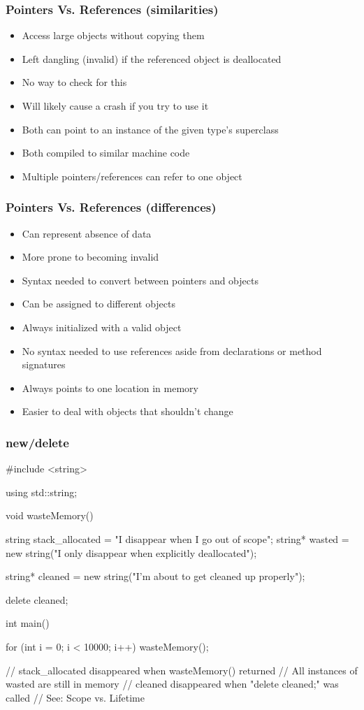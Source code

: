 \documentclass[glossy]{beamer}
\begin{document}
\begin{frame}[fragile=singleslide]
  \frametitle{Pointers Vs. References (similarities)}
  \begin{itemize}
    \item Access large objects without copying them
    \item Left dangling (invalid) if the referenced object is deallocated
    \item No way to check for this
    \item Will likely cause a crash if you try to use it
    \item Both can point to an instance of the given type's superclass
    \item Both compiled to similar machine code
    \item Multiple pointers/references can refer to one object
  \end{itemize}
\end{frame}

\begin{frame}[fragile=singleslide]
  \frametitle{Pointers Vs. References (differences)}
  \begin{itemize}
    \item Can represent absence of data
    \item More prone to becoming invalid
    \item Syntax needed to convert between pointers and objects
    \item Can be assigned to different objects
    \item Always initialized with a valid object
    \item No syntax needed to use references aside from declarations or method signatures
    \item Always points to one location in memory
    \item Easier to deal with objects that shouldn't change
  \end{itemize}
\end{frame}

\begin{frame}[fragile=singleslide]
  \frametitle{new/delete}
  \begin{cppcode}
#include <string>

using std::string;

void wasteMemory() {
  string stack_allocated = "I disappear when I go out of scope";
  string* wasted = new string("I only disappear when explicitly deallocated");

  string* cleaned = new string("I'm about to get cleaned up properly");

  delete cleaned;
}

int main() {
  for (int i = 0; i < 10000; i++) {
    wasteMemory();
  }

  // stack_allocated disappeared when wasteMemory() returned
  // All instances of wasted are still in memory
  // cleaned disappeared when "delete cleaned;" was called
  // See: Scope vs. Lifetime
}
  \end{cppcode}
\end{frame}
\end{document}
